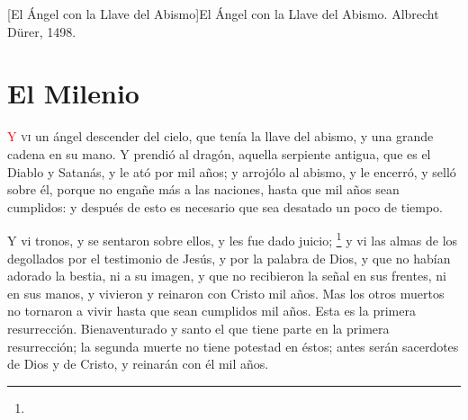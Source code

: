 [El Ángel con la Llave del Abismo]{El Ángel con la Llave del Abismo. Albrecht Dürer, 1498.}

\chapter{El Milenio}
\lettrine[lines=3,slope=-0.5em,loversize=0.1]{\textcolor{red}{Y}}{\hspace{0.5em} vi} un ángel descender del cielo, que tenía la llave del abismo, y una grande cadena en su mano. 
Y prendió al dragón, aquella serpiente antigua, que es el Diablo y Satanás, y le ató por mil años; 
y arrojólo al abismo, y le encerró,%
 y selló sobre él, porque no engañe más a las naciones, hasta que mil años sean cumplidos: y después de esto es necesario que sea desatado un poco de tiempo.

Y vi tronos, y se sentaron sobre ellos, y les fue dado juicio;%
	\footnote{ %
			  } %
 y vi las almas de los degollados por el testimonio de Jesús, y por la palabra de Dios, y que no habían adorado la bestia, ni a su imagen, y que no recibieron la señal en sus frentes, ni en sus manos, y vivieron%
 y reinaron con Cristo mil años.%
Mas los otros muertos no tornaron a vivir hasta que sean cumplidos mil años. Esta es la primera resurrección.
Bienaventurado y santo el que tiene parte en la primera resurrección; la segunda muerte no tiene potestad en éstos; antes serán sacerdotes de Dios y de Cristo, y reinarán con él mil años.

